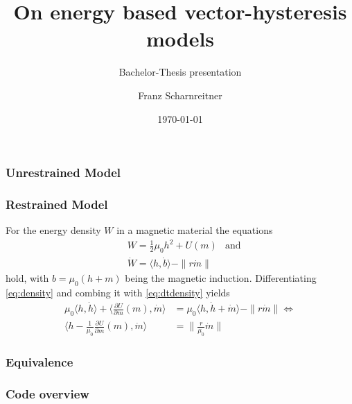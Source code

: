 \documentclass[utf8,aspectratio=169,ngerman,english]{beamer}
\begin{document}
\title{On energy based vector-hysteresis models}

\subtitle{Bachelor-Thesis presentation}

\author{Franz Scharnreitner}



\date{\today}

\maketitle

\begin{frame}
\frametitle{Unrestrained Model}

\end{frame}

\begin{frame}
\frametitle{Restrained Model}
For the energy density $W$ in a magnetic material the equations \begin{align} 
    &W = \frac{1}{2} \mu_0 h^2 + U(m) & \text{and} \label{eq:density} \\
    &\dot W = \langle h, \dot b \rangle - \|r\dot m\| \label{eq:dtdensity}
\end{align}
hold, with $b = \mu_0(h + m)$ being the magnetic induction. Differentiating \eqref{eq:density} and combing it with \eqref{eq:dtdensity} yields 
\begin{align}
 \mu_0 \langle h,\dot h \rangle + \langle \frac{\partial U}{\partial m}(m), \dot m \rangle &= \mu_0 \langle h,\dot h + \dot m \rangle - \|r \dot m\| \Leftrightarrow \\
 \langle h - \frac{1}{\mu_0} \frac{\partial U}{\partial m}(m), \dot m \rangle &= \|\frac{r}{\mu_0} \dot m \|
\end{align}


\end{frame}

\begin{frame}
\frametitle{Equivalence}

\end{frame}

\begin{frame}
 \frametitle{Code overview}

\end{frame}
\end{document}
